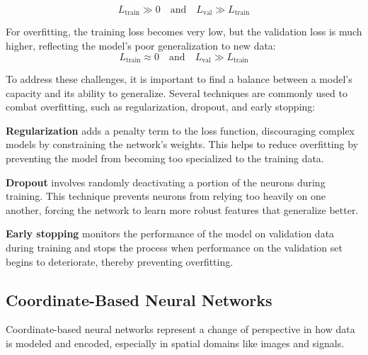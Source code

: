 
\[
  L_{\text{train}} \gg 0 \quad \text{and} \quad L_{\text{val}} \gg L_{\text{train}}
\]


For overfitting, the training loss becomes very low, but the validation loss is much higher, reflecting the model's poor generalization to new data: 
\[
  L_{\text{train}} \approx 0 \quad \text{and} \quad L_{\text{val}} \gg L_{\text{train}}
\]




To address these challenges, it is important to find a balance between a model's capacity and its ability to generalize. Several techniques are commonly used to combat overfitting, such as regularization, dropout, and early stopping:

\textbf{Regularization} adds a penalty term to the loss function, discouraging complex models by constraining the network's weights. This helps to reduce overfitting by preventing the model from becoming too specialized to the training data.
  
\textbf{Dropout} involves randomly deactivating a portion of the neurons during training. This technique prevents neurons from relying too heavily on one another, forcing the network to learn more robust features that generalize better.
  
\textbf{Early stopping} monitors the performance of the model on validation data during training and stops the process when performance on the validation set begins to deteriorate, thereby preventing overfitting.


\subsection{Coordinate-Based Neural Networks}


Coordinate-based neural networks represent a change of perspective in how data is modeled and encoded, especially in spatial domains like images and signals. 


